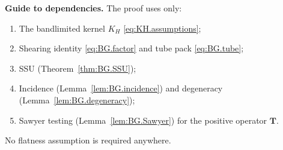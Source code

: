 \bigskip
\noindent\textbf{Guide to dependencies.}
The proof uses only:
\begin{enumerate}[label=(\roman*)]
\item The bandlimited kernel $K_H$ \eqref{eq:KH.assumptions};
\item Shearing identity \eqref{eq:BG.factor} and tube pack \eqref{eq:BG.tube};
\item SSU (Theorem~\ref{thm:BG.SSU});
\item Incidence (Lemma~\ref{lem:BG.incidence}) and degeneracy (Lemma~\ref{lem:BG.degeneracy});
\item Sawyer testing (Lemma~\ref{lem:BG.Sawyer}) for the positive operator $\mathbf T$.
\end{enumerate}
No flatness assumption is required anywhere.
\qedhere
